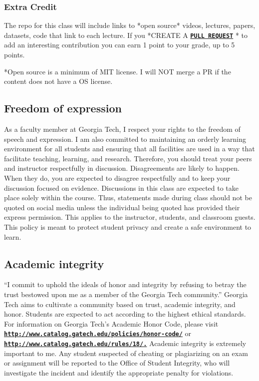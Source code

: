\documentclass[11pt]{article}
\begin{document}
\subsubsection*{Extra Credit}
The repo for this class will include links to *open source* videos, lectures, papers, datasets, code that link to each lecture. If you *CREATE A \href{https://docs.github.com/en/pull-requests/collaborating-with-pull-requests/proposing-changes-to-your-work-with-pull-requests/creating-a-pull-request}{\tt\bf  PULL REQUEST} * to add an interesting contribution you can earn 1 point to your grade, up to 5 points.


*Open source is a minimum of MIT license. I will NOT merge a PR if the content does not have a OS license.



\subsection*{Freedom of expression}
As   a   faculty   member   at   Georgia   Tech,   I   respect   your   rights   to   the   freedom   of   speech   and
expression.  I am also committed to maintaining an orderly learning environment for all students
and ensuring that all facilities are used in a way that facilitate teaching, learning, and research.
Therefore, you should treat your peers and instructor respectfully in discussion.  Disagreements
are likely to happen. When they do, you are expected to disagree respectfully and to keep your
discussion focused on evidence.
Discussions in this class are expected to take place solely within the course.   Thus, statements
made during class should not be quoted on social media unless the individual being quoted has
provided their express permission.  This applies to the instructor, students, and classroom guests.
This policy is meant to protect student privacy and create a safe environment to learn.
\subsection*{Academic integrity}
“I commit to uphold the ideals of honor and integrity by refusing to betray the trust bestowed
upon me as a member of the Georgia Tech community.”
Georgia   Tech   aims   to   cultivate   a   community   based   on   trust,   academic   integrity,   and   honor.
Students   are   expected   to   act   according   to   the   highest   ethical   standards.     For   information   on
Georgia   Tech's   Academic   Honor   Code,   please   visit
\href{http://www.catalog.gatech.edu/policies/honor-code/}{\tt\bf http://www.catalog.gatech.edu/policies/honor-code/}  or 
\href{http://www.catalog.gatech.edu/rules/18/.}{\tt\bf http://www.catalog.gatech.edu/rules/18/.} 
Academic integrity is extremely important to me.
Any student suspected of cheating or plagiarizing on an exam or assignment will be reported to
the Office of Student Integrity, who will investigate the incident and identify the appropriate
penalty for violations.
\end{document}
